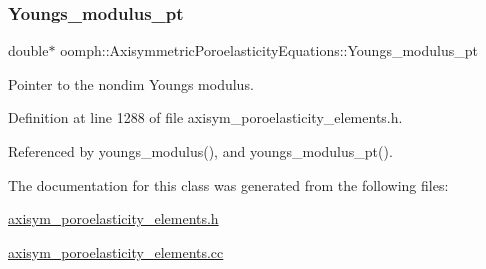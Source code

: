 \subsubsection{\texorpdfstring{Youngs\+\_\+modulus\+\_\+pt}{Youngs\_modulus\_pt}}
{\footnotesize\ttfamily double$\ast$ oomph\+::\+Axisymmetric\+Poroelasticity\+Equations\+::\+Youngs\+\_\+modulus\+\_\+pt\hspace{0.3cm}{\ttfamily [private]}}



Pointer to the nondim Young\textquotesingle{}s modulus. 



Definition at line 1288 of file axisym\+\_\+poroelasticity\+\_\+elements.\+h.



Referenced by youngs\+\_\+modulus(), and youngs\+\_\+modulus\+\_\+pt().



The documentation for this class was generated from the following files\+:\begin{DoxyCompactItemize}
\item 
\hyperlink{axisym__poroelasticity__elements_8h}{axisym\+\_\+poroelasticity\+\_\+elements.\+h}\item 
\hyperlink{axisym__poroelasticity__elements_8cc}{axisym\+\_\+poroelasticity\+\_\+elements.\+cc}\end{DoxyCompactItemize}
